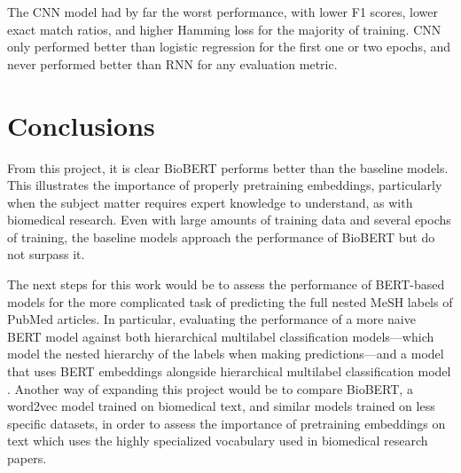 \documentclass[11pt]{article}
\begin{document}
The CNN model had by far the worst performance, with lower F1 scores, lower exact match ratios, and
higher Hamming loss for the majority of training. CNN only performed better than logistic regression
for the first one or two epochs, and never performed better than RNN for any evaluation metric.

\section{Conclusions}

From this project, it is clear BioBERT performs better than the baseline models. This
illustrates the importance of properly pretraining  embeddings, particularly when the subject
matter requires expert knowledge to understand, as with  biomedical research. Even with large
amounts of training data and several epochs of training, the baseline models approach the
performance of BioBERT but do not surpass it.

The next steps for this work would be to assess the performance of BERT-based models for the more
complicated task of predicting the full nested MeSH labels of PubMed articles. In particular,
evaluating the performance of a more naive BERT model against both hierarchical multilabel
classification models---which model the nested hierarchy of the labels when making
predictions---and a model that uses BERT embeddings alongside hierarchical multilabel classification
model \cite{zhang2025}. Another way of expanding this project would be to compare BioBERT, a
word2vec model trained on biomedical text, and similar models trained on less specific datasets, in
order to assess the importance of pretraining embeddings on text which uses the highly specialized
vocabulary used in biomedical research papers.



\end{document}
